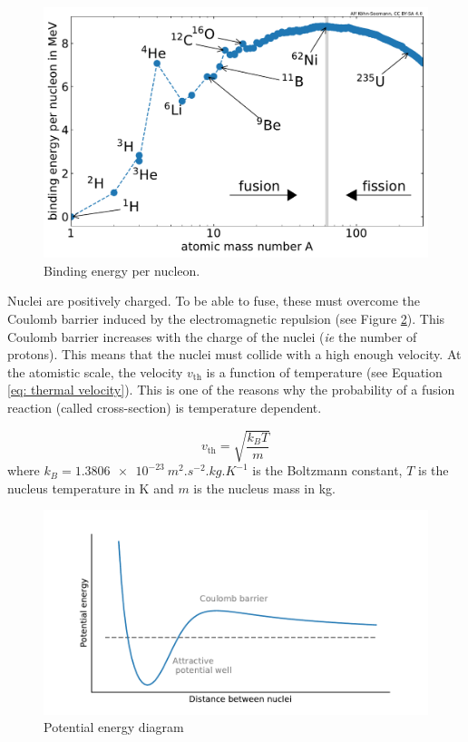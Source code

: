 \begin{figure} [h]
    \centering
    \includegraphics[width=\linewidth]{Figures/Chapter1/binding_energy_per_nucleon.pdf}
    \caption{Binding energy per nucleon.}
    \label{fig: binding energy per nucleon}
\end{figure}

Nuclei are positively charged.
To be able to fuse, these must overcome the Coulomb barrier induced by the electromagnetic repulsion (see Figure \ref{fig: potential energy diagram fusion}).
This Coulomb barrier increases with the charge of the nuclei (\textit{ie} the number of protons).
This means that the nuclei must collide with a high enough velocity.
At the atomistic scale, the velocity $v_\mathrm{th}$ is a function of temperature (see Equation \ref{eq: thermal velocity}).
This is one of the reasons why the probability of a fusion reaction (called cross-section) is temperature dependent.

\begin{equation}
    v_\mathrm{th} = \sqrt{\frac{k_B T}{m}}
    \label{eq: thermal velocity}
\end{equation}
where $k_B = \SI{1.3806e-23}{m^2.s^{-2}.kg.K^{-1}}$ is the Boltzmann constant, $T$ is the nucleus temperature in \si{K} and $m$ is the nucleus mass in \si{kg}.


\begin{figure} [h]
    \centering
    \includegraphics[width=\linewidth]{Figures/Chapter1/potential_energy.pdf}
    \caption{Potential energy diagram}
    \label{fig: potential energy diagram fusion}
\end{figure}

